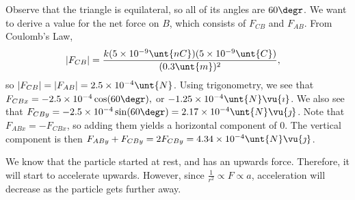 \documentclass[11pt]{article}
\begin{document}
\begin{solution}
	Observe that the triangle is equilateral, so all of its angles are $60\degr$. We want to derive a value for the net force on $B$, which consists of $F_{CB}$ and $F_{AB}$. From Coulomb's Law,
	\begin{align*}
		|F_{CB}| &= \frac{k(5\times 10^{-9}\unt{nC})(5\times 10^{-9}\unt{C})}{(0.3\unt{m})^2},
	\end{align*}
	so $|F_{CB}| = |F_{AB}| = 2.5 \times 10^{-4}\unt{N}$. Using trigonometry, we see that $F_{CBx} = -2.5\times 10^{-4}\cos(60\degr),$ or $-1.25\times 10^{-4}\unt{N}\vu{\imath}$. We also see that $F_{CBy} = -2.5\times 10^{-4}\sin(60\degr) = 2.17\times 10^{-4}\unt{N}\vu{\jmath}$. Note that $F_{ABx} = -F_{CBx}$, so adding them yields a horizontal component of 0. The vertical component is then $F_{ABy} + F_{CBy} = 2F_{CBy} = 4.34\times 10^{-4}\unt{N}\vu{\jmath}$.
	
	We know that the particle started at rest, and has an upwards force. Therefore, it will start to accelerate upwards. However, since $\frac{1}{r^2} \propto F \propto a$, acceleration will decrease as the particle gets further away.
\end{solution}
\end{document}
